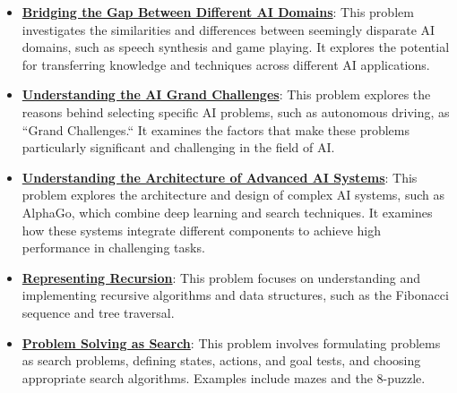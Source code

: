 \documentclass{article}%
\begin{document}
\begin{itemize}[leftmargin=*]
\item \href{https://purdue.brightspace.com/d2l/common/assets/pdfjs-d2l-dist/1.0.14-legacy/web/viewer.html?file=\%2Fcontent\%2Fenforced\%2F1095467-wl.202510.CS.24300.001\%2F02L2-Intro.pdf\%3Fou\%3D1095467\&lang=en-us\&container=d2l-fileviewer-rendered-pdf\&fullscreen=d2l-fileviewer-rendered-pdf-dialog\&height=667#page=31}{\textbf{Bridging the Gap Between Different AI Domains}}: This problem investigates the similarities and differences between seemingly disparate AI domains, such as speech synthesis and game playing. It explores the potential for transferring knowledge and techniques across different AI applications.%
\item \href{https://purdue.brightspace.com/d2l/common/assets/pdfjs-d2l-dist/1.0.14-legacy/web/viewer.html?file=\%2Fcontent\%2Fenforced\%2F1095467-wl.202510.CS.24300.001\%2F02L2-Intro.pdf\%3Fou\%3D1095467\&lang=en-us\&container=d2l-fileviewer-rendered-pdf\&fullscreen=d2l-fileviewer-rendered-pdf-dialog\&height=667#page=43}{\textbf{Understanding the AI Grand Challenges}}: This problem explores the reasons behind selecting specific AI problems, such as autonomous driving, as ``Grand Challenges.``  It examines the factors that make these problems particularly significant and challenging in the field of AI.%
\item \href{https://purdue.brightspace.com/d2l/common/assets/pdfjs-d2l-dist/1.0.14-legacy/web/viewer.html?file=\%2Fcontent\%2Fenforced\%2F1095467-wl.202510.CS.24300.001\%2F02L2-Intro.pdf\%3Fou\%3D1095467\&lang=en-us\&container=d2l-fileviewer-rendered-pdf\&fullscreen=d2l-fileviewer-rendered-pdf-dialog\&height=667#page=50}{\textbf{Understanding the Architecture of Advanced AI Systems}}: This problem explores the architecture and design of complex AI systems, such as AlphaGo, which combine deep learning and search techniques. It examines how these systems integrate different components to achieve high performance in challenging tasks.%
\item \href{https://purdue.brightspace.com/d2l/common/assets/pdfjs-d2l-dist/1.0.14-legacy/web/viewer.html?file=\%2Fcontent\%2Fenforced\%2F1095467-wl.202510.CS.24300.001\%2F14L1-DepthFS.pdf\%3Fou\%3D1095467\&lang=en-us\&container=d2l-fileviewer-rendered-pdf\&fullscreen=d2l-fileviewer-rendered-pdf-dialog\&height=667#page=3}{\textbf{Representing Recursion}}: This problem focuses on understanding and implementing recursive algorithms and data structures, such as the Fibonacci sequence and tree traversal.%
\item \href{https://purdue.brightspace.com/d2l/common/assets/pdfjs-d2l-dist/1.0.14-legacy/web/viewer.html?file=\%2Fcontent\%2Fenforced\%2F1095467-wl.202510.CS.24300.001\%2F14L1-DepthFS.pdf\%3Fou\%3D1095467\&lang=en-us\&container=d2l-fileviewer-rendered-pdf\&fullscreen=d2l-fileviewer-rendered-pdf-dialog\&height=667#page=12}{\textbf{Problem Solving as Search}}: This problem involves formulating problems as search problems, defining states, actions, and goal tests, and choosing appropriate search algorithms. Examples include mazes and the 8-puzzle.%

\end{itemize}
\end{document}
